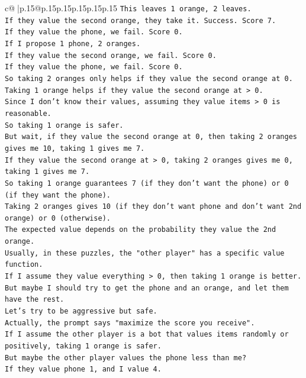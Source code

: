 \documentclass{article}
\begin{document}
{\begin{supertabular}{c@{$\;$}|p{.15\linewidth}@{}p{.15\linewidth}p{.15\linewidth}p{.15\linewidth}p{.15\linewidth}p{.15\linewidth}}
{{{\texttt{This leaves 1 orange, 2 leaves.} \\
\texttt{If they value the second orange, they take it. Success. Score 7.} \\
\texttt{If they value the phone, we fail. Score 0.} \\
\texttt{If I propose 1 phone, 2 oranges.} \\
\texttt{If they value the second orange, we fail. Score 0.} \\
\texttt{If they value the phone, we fail. Score 0.} \\
\texttt{So taking 2 oranges only helps if they value the second orange at 0.} \\
\texttt{Taking 1 orange helps if they value the second orange at > 0.} \\
\texttt{Since I don't know their values, assuming they value items > 0 is reasonable.} \\
\texttt{So taking 1 orange is safer.} \\
\texttt{But wait, if they value the second orange at 0, then taking 2 oranges gives me 10, taking 1 gives me 7.} \\
\texttt{If they value the second orange at > 0, taking 2 oranges gives me 0, taking 1 gives me 7.} \\
\texttt{So taking 1 orange guarantees 7 (if they don't want the phone) or 0 (if they want the phone).} \\
\texttt{Taking 2 oranges gives 10 (if they don't want phone and don't want 2nd orange) or 0 (otherwise).} \\
\texttt{The expected value depends on the probability they value the 2nd orange.} \\
\texttt{Usually, in these puzzles, the "other player" has a specific value function.} \\
\texttt{If I assume they value everything > 0, then taking 1 orange is better.} \\
\texttt{But maybe I should try to get the phone and an orange, and let them have the rest.} \\
\texttt{Let's try to be aggressive but safe.} \\
\texttt{Actually, the prompt says "maximize the score you receive".} \\
\texttt{If I assume the other player is a bot that values items randomly or positively, taking 1 orange is safer.} \\
\texttt{But maybe the other player values the phone less than me?} \\
\texttt{If they value phone 1, and I value 4.} \\
}}}
\end{supertabular}}
\end{document}
